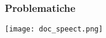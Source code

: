 \begin{frame}
  \frametitle{Problematiche}
      	\begin{center}
		\texttt{[image: doc\_speect.png]}	
	\end{center}
\end{frame}
